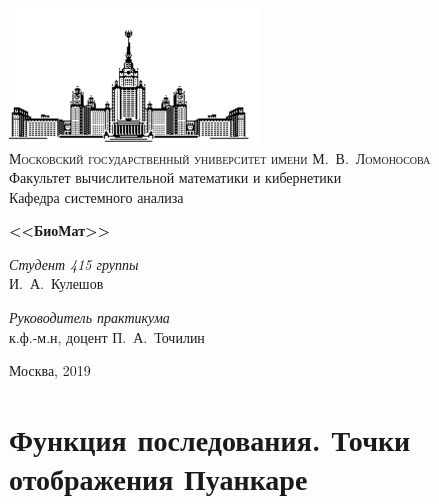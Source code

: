 \documentclass[oneside, final, 12pt]{article}
\theoremstyle{def}
\theoremstyle{th}
\theoremstyle{rem}
\numberwithin{figure}{section}
\numberwithin{equation}{section}
\begin{document}
\thispagestyle{empty}

\begin{center}
\ \vspace{-3cm}

\includegraphics[width=0.5\textwidth]{pict/msu.pdf}\\
{\scshape Московский государственный университет имени М.~В.~Ломоносова}\\
Факультет вычислительной математики и кибернетики\\
Кафедра системного анализа

\vfill

\vspace{5cm}

{\Huge\bfseries <<БиоМат>>}
\end{center}

\vspace{3cm}

\begin{flushright}
    \large
    \textit{Студент 415 группы}\\
    И.~А.~Кулешов
    \vspace{5mm}
    
    \textit{Руководитель практикума}\\
    к.ф.-м.н, доцент П.~А.~Точилин
\end{flushright}

\vfill

\begin{center}
Москва, 2019
\end{center}

\section{Функция последования. Точки отображения Пуанкаре}
\end{document}
